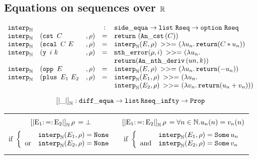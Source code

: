 \subsection*{Equations on sequences over $\R$}

\label{interpN}
$$\begin{array}{lllcl}
\IN & & & : & \se \rightarrow \alist{} \Rseq \rightarrow \option{} \Rseq \\
\IN & (\cst~ C & , \rho) & = & \return~ (\C{}(C))\\
\IN & (\scal~ C ~ E &, \rho) & = & \IN(E, \rho) \bind (\lambda u_n. \return (C * u_n))\\
\IN & (\y ~ i ~ k &, \rho) & = & \ntherr(\rho, i) \bind (\lambda u_n. \\
    & & &   & \return (\Dn{}(un,k)) \\
\IN & (\opp ~E &, \rho) & = & \IN(E,\rho) \bind (\lambda u_n. \return (- u_n))\\
\IN & (\plus ~ E_1 ~ E_2 &, \rho) & = & \IN(E_1,\rho) \bind (\lambda u_n.\\
    & & &   & \IN(E_2,\rho) \bind (\lambda v_n. \return (u_n + v_n)))\\
\end{array}$$

$$\left[\left| \_ \right|\right]_{\N} : \de \rightarrow \alist{}
\mathtt{Rseq\_infty} \rightarrow \Prop$$

\begin{center}
\begin{tabular}{c|c}
\begin{minipage}{0.45\textwidth}
$$\SemN{} = \bot$$
$$\text{if } \left\lbrace
\begin{array}{ll}
& \IN(E_1, \rho) = \None\\
\text{or} & \IN(E_2, \rho) = \None
\end{array}\right.$$
\end{minipage}

& \begin{minipage}{0.45\textwidth}
$$\SemN{} = \forall n \in \N. u_n(n) = v_n(n)$$
$$\text{if } \left\lbrace
\begin{array}{ll}
& \IN(E_1, \rho) = \Some u_n\\
\text{and} & \IN(E_2, \rho) = \Some v_n
\end{array}\right.$$
\end{minipage}

\end{tabular}
\end{center}
